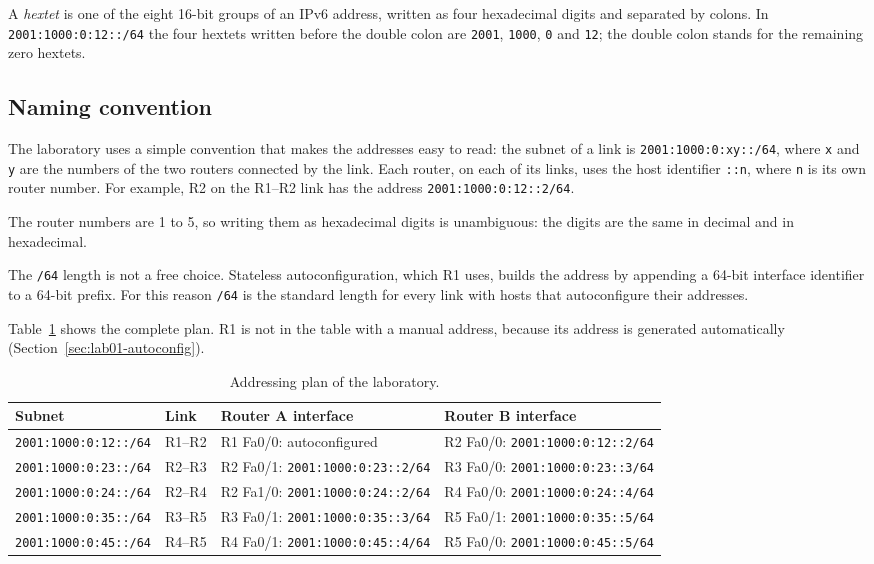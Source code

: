 A \emph{hextet} is one of the eight 16-bit groups of an IPv6 address, written as four hexadecimal digits and separated by colons. In \texttt{2001:1000:0:12::/64} the four hextets written before the double colon are \texttt{2001}, \texttt{1000}, \texttt{0} and \texttt{12}; the double colon stands for the remaining zero hextets.

\subsection{Naming convention}

The laboratory uses a simple convention that makes the addresses easy to read: the subnet of a link is \texttt{2001:1000:0:xy::/64}, where \texttt{x} and \texttt{y} are the numbers of the two routers connected by the link. Each router, on each of its links, uses the host identifier \texttt{::n}, where \texttt{n} is its own router number. For example, R2 on the R1--R2 link has the address \texttt{2001:1000:0:12::2/64}.

The router numbers are 1 to 5, so writing them as hexadecimal digits is unambiguous: the digits are the same in decimal and in hexadecimal.

The \texttt{/64} length is not a free choice. Stateless autoconfiguration, which R1 uses, builds the address by appending a 64-bit interface identifier to a 64-bit prefix. For this reason \texttt{/64} is the standard length for every link with hosts that autoconfigure their addresses.

Table~\ref{tab:lab01-plan} shows the complete plan. R1 is not in the table with a manual address, because its address is generated automatically (Section~\ref{sec:lab01-autoconfig}).

\begin{table}[h]
\centering
\footnotesize
\begin{tabular}{@{}p{3.4cm}p{1.2cm}p{5.2cm}p{5.2cm}@{}}
\toprule
\textbf{Subnet} & \textbf{Link} & \textbf{Router A interface} & \textbf{Router B interface} \\
\midrule
\texttt{2001:1000:0:12::/64} & R1--R2 & R1 Fa0/0: autoconfigured & R2 Fa0/0: \texttt{2001:1000:0:12::2/64} \\
\texttt{2001:1000:0:23::/64} & R2--R3 & R2 Fa0/1: \texttt{2001:1000:0:23::2/64} & R3 Fa0/0: \texttt{2001:1000:0:23::3/64} \\
\texttt{2001:1000:0:24::/64} & R2--R4 & R2 Fa1/0: \texttt{2001:1000:0:24::2/64} & R4 Fa0/0: \texttt{2001:1000:0:24::4/64} \\
\texttt{2001:1000:0:35::/64} & R3--R5 & R3 Fa0/1: \texttt{2001:1000:0:35::3/64} & R5 Fa0/1: \texttt{2001:1000:0:35::5/64} \\
\texttt{2001:1000:0:45::/64} & R4--R5 & R4 Fa0/1: \texttt{2001:1000:0:45::4/64} & R5 Fa0/0: \texttt{2001:1000:0:45::5/64} \\
\bottomrule
\end{tabular}
\caption{Addressing plan of the laboratory.}
\label{tab:lab01-plan}
\end{table}


